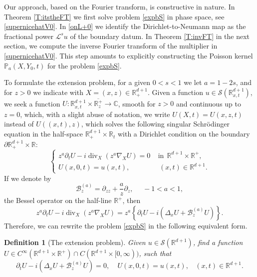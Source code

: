 \documentclass[11pt,letter]{amsart}
\def \RNu {\mathbb{R}^{d+1}}
\def \RN {\mathbb{R}_+^{d+1}}
\def \R {\mathbb{R}}
\newcommand{\p}{\partial}
\numberwithin{equation}{section}
\newcommand{\C}{\mathbb{C}}
\newtheorem{definition}[theorem]{Definition}
\numberwithin{equation}{section}
\begin{document}
Our approach, based on the Fourier transform, is  constructive in nature. In Theorem \ref{T:itstheFT} we first solve problem \eqref{expbS} in phase space, see \eqref{supernicehatV0}. In \eqref{onL+0} we identify the Dirichlet-to-Neumann map as the fractional power $\mathcal L^s u$ of the boundary datum. In Theorem \ref{T:invFT} in the next section, we compute the inverse Fourier transform of the multiplier in \eqref{supernicehatV0}. This step amounts to explicitly constructing the Poisson kernel $\mathbb P_a(X,Y_0,t)$ for the problem \eqref{expbS}.

To formulate the extension problem, for a given $0<s<1$ we let $a = 1-2s$, and for $z>0$ we indicate with $X= (x,z)\in \RN$. Given a function $u\in \mathscr S(\R^{d+1}_{x,t})$, we seek a function $U:\R^{d+1}_{x,t}\times \overline{\R^+_z}\to \C$, smooth for $z>0$ and continuous up to $z=0$, which, with a slight abuse of notation, we write $U(X,t) = U(x,z,t)$ instead of $U((x,t),z)$, which solves the following singular Schr\"odinger equation in the half-space $\RN\times \R_t$ with a Dirichlet condition on the boundary $\p \RN\times \R$:
\begin{equation}\label{expbS}
\begin{cases}
z^a \p_t U- i \operatorname{div}_X(z^a \nabla_X U) = 0 \ \ \ \ \ \text{in}\ \ \R^{d+1}\times\R^+,
\\
U(x,0,t) = u(x,t),\ \ \ \ \ \ \ \ \ \ \ \ \ \ \ \ \ \ \ (x,t)\in \RNu.
\end{cases}
\end{equation} 
If we denote by 
\begin{equation}\label{Ba}
\mathscr B_z^{(a)} = \p_{zz}  + \frac az \p_z,\ \ \ \ \ \ -1<a<1,
\end{equation}
the Bessel operator on the half-line $\R^+$, then 
\[
z^a \p_t U - i \operatorname{div}_X(z^a \nabla_X U) = z^a\left\{\p_t U - i \left(\Delta_x U+ \mathscr B_z^{(a)} U\right)\right\}.
\]
Therefore, we can rewrite the problem \eqref{expbS} in the following equivalent form.

\begin{definition}[The extension problem]\label{D:ep}
Given $u\in \mathscr S(\RNu)$, find a function $U\in C^\infty(\RNu\times \R^+)\cap C(\RNu\times [0,\infty))$,  such that
\begin{equation}\label{ep}
\p_t U - i \left(\Delta_x U + \mathscr B_z^{(a)} U\right) = 0,\ \ \ \ \ U(x,0,t) = u(x,t),\ \ \ \  (x,t)\in \R^{d+1}.
\end{equation}
\end{definition}
\end{document}
